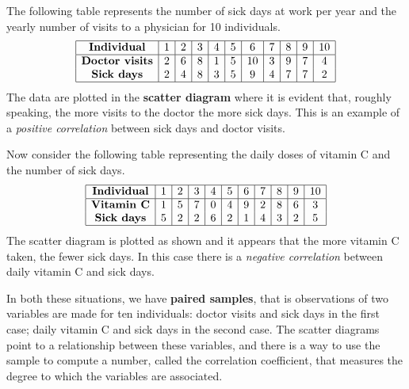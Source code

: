 The following table represents the number of sick days at work per year and the yearly number of visits to a physician for 10 individuals.
\begin{equation*}
\begin{array}{|c|c|c|c|c|c|c|c|c|c|c|}
	\hline
	\textbf{\mbox{Individual}} 		& 1 & 2 & 3 & 4 & 5 & 6 & 7 & 8 & 9 & 10 \\ \hline
	\textbf{\mbox{Doctor visits}}	& 2 & 6 & 8 & 1 & 5 &10 & 3 & 9 & 7 &  4 \\
	\textbf{\mbox{Sick days}}		& 2 & 4 & 8 & 3 & 5 & 9 & 4 & 7 & 7 &  2 \\ \hline
\end{array}
\end{equation*}
The data are plotted in the \textbf{scatter diagram} where it is evident that, roughly speaking, the more visits to the doctor the more sick days. This is an example of a \textit{positive correlation} between sick days and doctor visits.

\begin{wrapfigure}[8]{l}{5cm} 
\centering

\end{wrapfigure}

Now consider the following table representing the daily doses of vitamin C and the number of sick days.
\begin{equation*}
\begin{array}{|c|c|c|c|c|c|c|c|c|c|c|}
	\hline
	\textbf{\mbox{Individual}} 		& 1 & 2 & 3 & 4 & 5 & 6 & 7 & 8 & 9 & 10 \\ \hline
	\textbf{\mbox{Vitamin C}}		& 1 & 5 & 7 & 0 & 4 & 9 & 2 & 8 & 6 &  3 \\
	\textbf{\mbox{Sick days}}		& 5 & 2 & 2 & 6 & 2 & 1 & 4 & 3 & 2 &  5 \\ \hline
\end{array}
\end{equation*}
The scatter diagram is plotted as shown and it appears that the more vitamin C taken, the fewer sick days. In this case there is a \textit{negative correlation} between daily vitamin C and sick days.

In both these situations, we have \textbf{paired samples}, that is observations of two variables are made for ten individuals: doctor visits and sick days in the first case; daily vitamin C and sick days in the second case. The scatter diagrams point to a relationship between these variables, and there is a way to use the sample to compute a number, called the correlation coefficient, that measures the degree to which the variables are associated.

